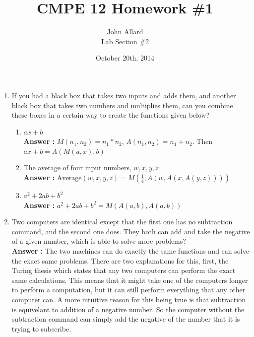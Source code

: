 \documentclass[a4paper,11pt]{article}
\title{ CMPE 12 Homework \#1 \\[7 in]}
\author{John Allard \\ Lab Section \#2}
\date{October 20th, 2014}
\begin{document}
\maketitle
\newpage


\begin{enumerate}
\item If you had a black box that takes two inputs and adds them, and another black box that takes two numbers and multiplies them, can you combine these boxes in a certain way to create the functions given below?

  \begin{enumerate}

  \item $ax+b$ \\
  \textbf{Answer :} $M(n_1, n_2) = n_1*n_2$, $A(n_1, n_2) = n_1+n_2$. Then $ax+b = A(M(a, x), b)$ 

  \item The average of four input numbers, $w, x, y, z$ \\
  \textbf{Answer :} $\text{Average}(w, x, y, z) = M(\frac{1}{4}, A(w, A(x, A(y, z))))$

  \item $a^2 + 2ab + b^2$ \\
  \textbf{Answer :} $a^2 + 2ab + b^2 = M(A(a,b), A(a,b)) $ 


  \end{enumerate}

\item Two computers are identical except that the first one has no subtraction command, and the second one does. They both can add and take the negative of a given number, which is able to solve more problems? \\
\textbf{Answer :} The two machines can do exactly the same functions and can solve the exact same problems. There are two explanations for this, first, the Turing thesis which states that any two computers can perform the exact same calculations. This means that it might take one of the computers longer to perform a computation, but it can still perform everything that any other computer can. A more intuitive reason for this being true is that subtraction is equivelant to addition of a negative number. So the computer without the subtraction command can simply add the negative of the number that it is trying to subscribe. 


\end{enumerate}
\end{document}
